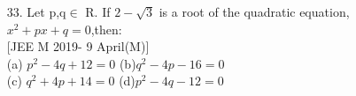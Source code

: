 \documentclass[journal,12pt,twocolumn]{IEEEtran}
\theoremstyle{remark}
\begin{document}
\begin{enumerate}
(c)  2\hspace{5cm}(d)  -1\\[6pt]
\item[33.]Let p,q$\in$ R. If $2-\sqrt{3}$ is a root of the quadratic equation, $x^2+px+q=0$,then:\\[6pt]
[JEE M 2019- 9 April(M)]\\[6pt]
(a)  $p^2-4q+12=0$ \hspace{1cm}(b)$q^2-4p-16=0$\\[2pt]
(c)  $q^2+4p+14=0$ \hspace{1cm}(d)$p^2-4q-12=0$\\[6pt]

\bigskip

\renewcommand{\thefigure}{\theenumi}
\renewcommand{\thetable}{\theenumi}

\end{enumerate}
\end{document}
